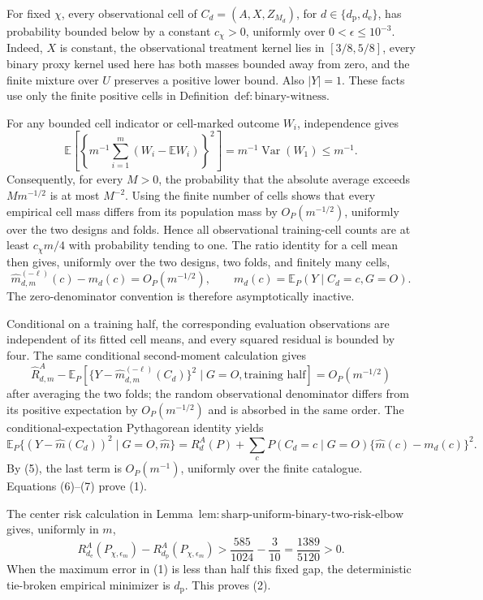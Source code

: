 For fixed \(\chi\), every observational cell of \(C_d=(A,X,Z_{M_d})\), for \(d\in\{d_{\mathrm p},d_{\mathrm e}\}\), has probability bounded below by a constant \(c_\chi>0\), uniformly over \(0<\epsilon\le10^{-3}\).  Indeed, \(X\) is constant, the observational treatment kernel lies in \([3/8,5/8]\), every binary proxy kernel used here has both masses bounded away from zero, and the finite mixture over \(U\) preserves a positive lower bound.  Also \(|Y|=1\).  These facts use only the finite positive cells in Definition~\(\mathrm{def{:}binary\text{-}witness}\).

For any bounded cell indicator or cell-marked outcome \(W_i\), independence gives
\[
 \mathbb E\left[\left\{m^{-1}\sum_{i=1}^m(W_i-\mathbb EW_i)\right\}^2\right]
 =m^{-1}\operatorname{Var}(W_1)\le m^{-1}.
\]
Consequently, for every \(M>0\), the probability that the absolute average exceeds \(Mm^{-1/2}\) is at most \(M^{-2}\).  Using the finite number of cells shows that every empirical cell mass differs from its population mass by \(O_P(m^{-1/2})\), uniformly over the two designs and folds.  Hence all observational training-cell counts are at least \(c_\chi m/4\) with probability tending to one.  The ratio identity for a cell mean then gives, uniformly over the two designs, two folds, and finitely many cells,
\[
 \widehat m_{d,m}^{(-\ell)}(c)-m_d(c)=O_P(m^{-1/2}),
 \qquad
 m_d(c)=\mathbb E_P(Y\mid C_d=c,G=O).                                         \tag{5}
\]
The zero-denominator convention is therefore asymptotically inactive.

Conditional on a training half, the corresponding evaluation observations are independent of its fitted cell means, and every squared residual is bounded by four.  The same conditional second-moment calculation gives
\[
 \widehat R_{d,m}^A-
 \mathbb E_P\!\left[
 \{Y-\widehat m_{d,m}^{(-\ell)}(C_d)\}^2\mid G=O,
 \text{training half}\right]
 =O_P(m^{-1/2})                                                               \tag{6}
\]
after averaging the two folds; the random observational denominator differs from its positive expectation by \(O_P(m^{-1/2})\) and is absorbed in the same order.  The conditional-expectation Pythagorean identity yields
\[
 \mathbb E_P\{(Y-\widehat m(C_d))^2\mid G=O,\widehat m\}
 =R_d^A(P)+\sum_cP(C_d=c\mid G=O)\{\widehat m(c)-m_d(c)\}^2.                 \tag{7}
\]
By (5), the last term is \(O_P(m^{-1})\), uniformly over the finite catalogue.  Equations (6)--(7) prove (1).

The center risk calculation in Lemma~\(\mathrm{lem{:}sharp\text{-}uniform\text{-}binary\text{-}two\text{-}risk\text{-}elbow}\) gives, uniformly in \(m\),
\[
 R_{d_{\mathrm e}}^A(P_{\chi,\epsilon_m})
 -R_{d_{\mathrm p}}^A(P_{\chi,\epsilon_m})
 >\frac{585}{1024}-\frac3{10}
 =\frac{1389}{5120}>0.                                                        \tag{8}
\]
When the maximum error in (1) is less than half this fixed gap, the deterministic tie-broken empirical minimizer is \(d_{\mathrm p}\).  This proves (2).

